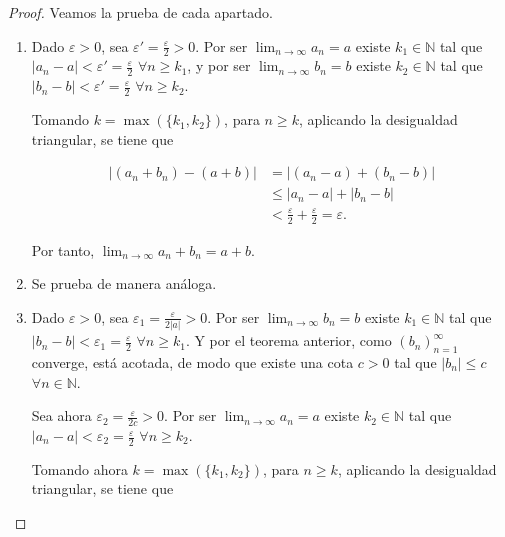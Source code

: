 \documentclass[
  a4paper,
]{scrreport}
\theoremstyle{definition}
\theoremstyle{plain}
\theoremstyle{definition}
\theoremstyle{definition}
\theoremstyle{plain}
\theoremstyle{plain}
\theoremstyle{remark}
\begin{document}
\begin{tcolorbox}[enhanced jigsaw, leftrule=.75mm, colbacktitle=quarto-callout-note-color!10!white, toprule=.15mm, opacityback=0, opacitybacktitle=0.6, toptitle=1mm, breakable, bottomtitle=1mm, colframe=quarto-callout-note-color-frame, rightrule=.15mm, titlerule=0mm, title=\textcolor{quarto-callout-note-color}{\faInfo}\hspace{0.5em}{Demostración}, arc=.35mm, left=2mm, bottomrule=.15mm, colback=white, coltitle=black]

\begin{proof}
Veamos la prueba de cada apartado.

\begin{enumerate}
\def\labelenumi{\alph{enumi}.}
\item
  Dado \(\varepsilon>0\), sea \(\varepsilon'=\frac{\varepsilon}{2}>0\).
  Por ser \(\lim_{n\to\infty}a_n=a\) existe \(k_1\in\mathbb{N}\) tal que
  \(|a_n-a|<\varepsilon'=\frac{\varepsilon}{2}\) \(\forall n\geq k_1\),
  y por ser \(\lim_{n\to\infty}b_n=b\) existe \(k_2\in\mathbb{N}\) tal
  que \(|b_n-b|<\varepsilon'=\frac{\varepsilon}{2}\)
  \(\forall n\geq k_2\).

  Tomando \(k=\max(\{k_1,k_2\})\), para \(n\geq k\), aplicando la
  desigualdad triangular, se tiene que

  \begin{align*}
   |(a_n+b_n)-(a+b)| &= |(a_n-a)+(b_n-b)|\\
   &\leq |a_n-a|+|b_n-b|\\ 
   &<\frac{\varepsilon}{2}+\frac{\varepsilon}{2}=\varepsilon.
   \end{align*}

  Por tanto, \(\lim_{n\to\infty}a_n+b_n = a+b\).
\item
  Se prueba de manera análoga.
\item
  Dado \(\varepsilon>0\), sea
  \(\varepsilon_1=\frac{\varepsilon}{2|a|}>0\). Por ser
  \(\lim_{n\to\infty}b_n=b\) existe \(k_1\in\mathbb{N}\) tal que
  \(|b_n-b|<\varepsilon_1=\frac{\varepsilon}{2}\) \(\forall n\geq k_1\).
  Y por el teorema anterior, como \((b_n)_{n=1}^\infty\) converge, está
  acotada, de modo que existe una cota \(c>0\) tal que \(|b_n|\leq c\)
  \(\forall n\in\mathbb{N}\).

  Sea ahora \(\varepsilon_2=\frac{\varepsilon}{2c}>0\). Por ser
  \(\lim_{n\to\infty}a_n=a\) existe \(k_2\in\mathbb{N}\) tal que
  \(|a_n-a|<\varepsilon_2=\frac{\varepsilon}{2}\) \(\forall n\geq k_2\).

  Tomando ahora \(k=\max(\{k_1,k_2\})\), para \(n\geq k\), aplicando la
  desigualdad triangular, se tiene que


\end{enumerate}
\end{proof}
\end{tcolorbox}
\end{document}
